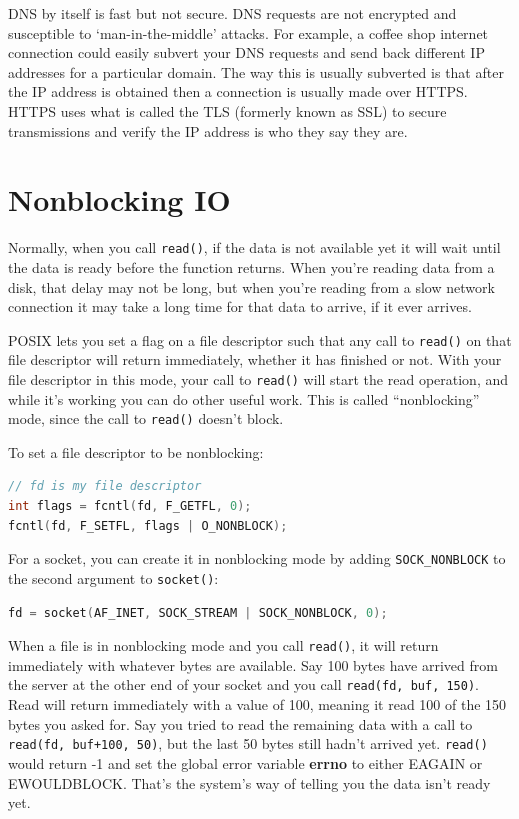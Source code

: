 DNS by itself is fast but not secure. DNS requests are not encrypted and susceptible to `man-in-the-middle' attacks. For example, a coffee shop internet connection could easily subvert your DNS requests and send back different IP addresses for a particular domain. The way this is usually subverted is that after the IP address is obtained then a connection is usually made over HTTPS. HTTPS uses what is called the TLS (formerly known as SSL) to secure transmissions and verify the IP address is who they say they are.

\section{Nonblocking IO}

Normally, when you call \texttt{read()}, if the data is not available yet it will wait until the data is ready before the function returns. When you're reading data from a disk, that delay may not be long, but when you're reading from a slow network connection it may take a long time for that data to arrive, if it ever arrives.

POSIX lets you set a flag on a file descriptor such that any call to \texttt{read()} on that file descriptor will return immediately, whether it has finished or not. With your file descriptor in this mode, your call to \texttt{read()} will start the read operation, and while it's working you can do other useful work. This is called ``nonblocking'' mode, since the call to \texttt{read()} doesn't block.

To set a file descriptor to be nonblocking:

\begin{lstlisting}[language=C]
// fd is my file descriptor
int flags = fcntl(fd, F_GETFL, 0);
fcntl(fd, F_SETFL, flags | O_NONBLOCK);
\end{lstlisting}

For a socket, you can create it in nonblocking mode by adding \texttt{SOCK\_NONBLOCK} to the second argument to \texttt{socket()}:

\begin{lstlisting}[language=C]
fd = socket(AF_INET, SOCK_STREAM | SOCK_NONBLOCK, 0);
\end{lstlisting}

When a file is in nonblocking mode and you call \texttt{read()}, it will return immediately with whatever bytes are available. Say 100 bytes have arrived from the server at the other end of your socket and you call \texttt{read(fd, buf, 150)}. Read will return immediately with a value of 100, meaning it read 100 of the 150 bytes you asked for. Say you tried to read the remaining data with a call to \texttt{read(fd, buf+100, 50)}, but the last 50 bytes still hadn't arrived yet. \texttt{read()} would return -1 and set the global error variable \textbf{errno} to either EAGAIN or EWOULDBLOCK. That's the system's way of telling you the data isn't ready yet.


